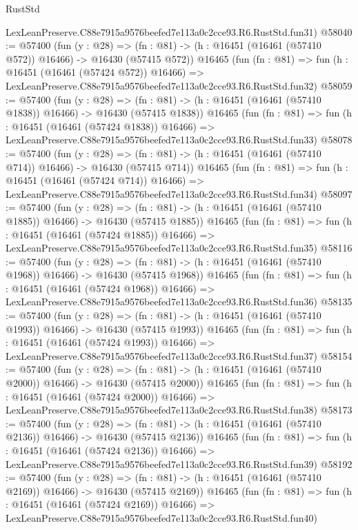 \begin{lexlean}{RustStd}
\begin{coremodule}
    LexLeanPreserve.C88e7915a9576beefed7e113a0c2cce93.R6.RustStd.fun31)
@58040 := @57400
    (fun (y : @28) =>
    (fn : @81) -> (h : @16451 (@16461 (@57410 @572)) @16466) -> @16430 (@57415 @572))
    @16465
    (fun (fn : @81) =>
    fun (h : @16451 (@16461 (@57424 @572)) @16466) =>
    LexLeanPreserve.C88e7915a9576beefed7e113a0c2cce93.R6.RustStd.fun32)
@58059 := @57400
    (fun (y : @28) =>
    (fn : @81) -> (h : @16451 (@16461 (@57410 @1838)) @16466) -> @16430 (@57415 @1838))
    @16465
    (fun (fn : @81) =>
    fun (h : @16451 (@16461 (@57424 @1838)) @16466) =>
    LexLeanPreserve.C88e7915a9576beefed7e113a0c2cce93.R6.RustStd.fun33)
@58078 := @57400
    (fun (y : @28) =>
    (fn : @81) -> (h : @16451 (@16461 (@57410 @714)) @16466) -> @16430 (@57415 @714))
    @16465
    (fun (fn : @81) =>
    fun (h : @16451 (@16461 (@57424 @714)) @16466) =>
    LexLeanPreserve.C88e7915a9576beefed7e113a0c2cce93.R6.RustStd.fun34)
@58097 := @57400
    (fun (y : @28) =>
    (fn : @81) -> (h : @16451 (@16461 (@57410 @1885)) @16466) -> @16430 (@57415 @1885))
    @16465
    (fun (fn : @81) =>
    fun (h : @16451 (@16461 (@57424 @1885)) @16466) =>
    LexLeanPreserve.C88e7915a9576beefed7e113a0c2cce93.R6.RustStd.fun35)
@58116 := @57400
    (fun (y : @28) =>
    (fn : @81) -> (h : @16451 (@16461 (@57410 @1968)) @16466) -> @16430 (@57415 @1968))
    @16465
    (fun (fn : @81) =>
    fun (h : @16451 (@16461 (@57424 @1968)) @16466) =>
    LexLeanPreserve.C88e7915a9576beefed7e113a0c2cce93.R6.RustStd.fun36)
@58135 := @57400
    (fun (y : @28) =>
    (fn : @81) -> (h : @16451 (@16461 (@57410 @1993)) @16466) -> @16430 (@57415 @1993))
    @16465
    (fun (fn : @81) =>
    fun (h : @16451 (@16461 (@57424 @1993)) @16466) =>
    LexLeanPreserve.C88e7915a9576beefed7e113a0c2cce93.R6.RustStd.fun37)
@58154 := @57400
    (fun (y : @28) =>
    (fn : @81) -> (h : @16451 (@16461 (@57410 @2000)) @16466) -> @16430 (@57415 @2000))
    @16465
    (fun (fn : @81) =>
    fun (h : @16451 (@16461 (@57424 @2000)) @16466) =>
    LexLeanPreserve.C88e7915a9576beefed7e113a0c2cce93.R6.RustStd.fun38)
@58173 := @57400
    (fun (y : @28) =>
    (fn : @81) -> (h : @16451 (@16461 (@57410 @2136)) @16466) -> @16430 (@57415 @2136))
    @16465
    (fun (fn : @81) =>
    fun (h : @16451 (@16461 (@57424 @2136)) @16466) =>
    LexLeanPreserve.C88e7915a9576beefed7e113a0c2cce93.R6.RustStd.fun39)
@58192 := @57400
    (fun (y : @28) =>
    (fn : @81) -> (h : @16451 (@16461 (@57410 @2169)) @16466) -> @16430 (@57415 @2169))
    @16465
    (fun (fn : @81) =>
    fun (h : @16451 (@16461 (@57424 @2169)) @16466) =>
    LexLeanPreserve.C88e7915a9576beefed7e113a0c2cce93.R6.RustStd.fun40)

\end{coremodule}
\end{lexlean}
